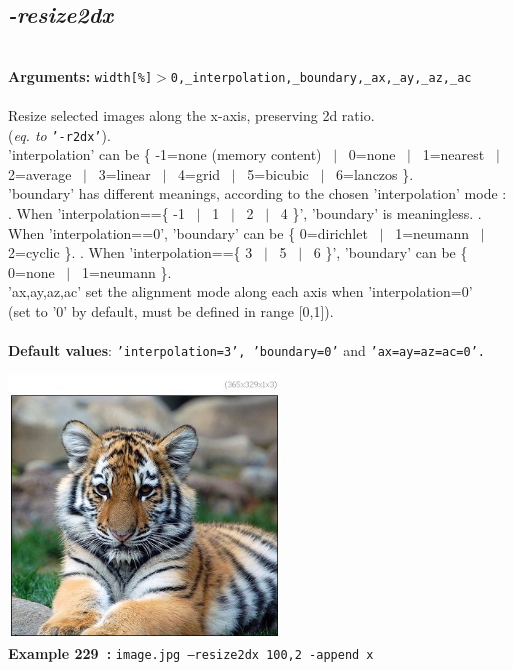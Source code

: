 \documentclass[a4paper,11pt,twoside]{book}
\begin{document}
\subsection{\emph{-resize2dx} }\vspace*{-0.5em}
~\\\textbf{Arguments: } 
{\small \texttt{width[\%]$>$0,\_interpolation,\_boundary,\_ax,\_ay,\_az,\_ac}}\\~\\
Resize selected images along the x-axis, preserving 2d ratio.
~\\(\emph{eq. to} {\small \texttt{'-r2dx'}}).
~\\'interpolation' can be \{ -1=none (memory content) ~$|$~ 0=none ~$|$~ 1=nearest ~$|$~ 2=average ~$|$~ 3=linear ~$|$~ 4=grid ~$|$~ 5=bicubic ~$|$~ 6=lanczos \}.
~\\'boundary' has different meanings, according to the chosen 'interpolation' mode :
. When 'interpolation==\{ -1 ~$|$~ 1 ~$|$~ 2 ~$|$~ 4 \}', 'boundary' is meaningless.
. When 'interpolation==0', 'boundary' can be \{ 0=dirichlet ~$|$~ 1=neumann ~$|$~ 2=cyclic \}.
. When 'interpolation==\{ 3 ~$|$~ 5 ~$|$~ 6 \}', 'boundary' can be \{ 0=none ~$|$~ 1=neumann \}.
~\\'ax,ay,az,ac' set the alignment mode along each axis when 'interpolation=0'
~\\(set to '0' by default, must be defined in range [0,1]).
~\\~\\\textbf{Default values}: {\small \texttt{'interpolation=3', 'boundary=0'} and \texttt{'ax=ay=az=ac=0'.}}
\begin{center}\includegraphics[keepaspectratio=true,height=7cm,width=\textwidth]{img/gmic_def229.jpg}\\
{\footnotesize \textbf{Example 229~:} \texttt{image.jpg --resize2dx 100,2 -append x}}
\end{center}
\end{document}
